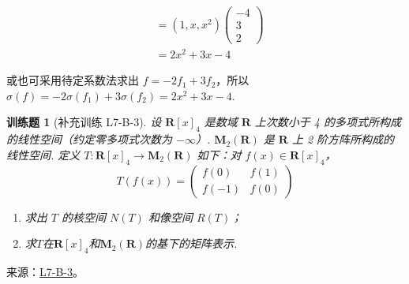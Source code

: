 \documentclass[UTF8,12pt,a4paper,fontset=fandol]{ctexart}
\newtheorem{exercise}{训练题}[section]
\begin{document}
\begin{solve}
\begin{enumerate}
\begin{align*}
                                    & = (1, x, x^2)
                          \begin{pmatrix} -4 \\ 3 \\ 2 \end{pmatrix}                          \\
                                    & = 2x^2 + 3x - 4
                      \end{align*}

                      或也可采用待定系数法求出 $ f = -2 f_1 + 3 f_2 $，所以 $ \sigma(f) = -2 \sigma(f_1) + 3 \sigma(f_2) = 2x^2 + 3x - 4 $.
            \end{enumerate}
\end{solve}

\begin{exercise}[补充训练 L7-B-3]\label{prob:L7-B-3}
设 $\mathbf{R}[x]_4$ 是数域 $\mathbf{R}$ 上次数小于 4 的多项式所构成的线性空间（约定零多项式次数为 $-\infty$）. $\mathbf{M}_2(\mathbf{R})$ 是 $\mathbf{R}$ 上 2 阶方阵所构成的线性空间. 定义 $T \colon \mathbf{R}[x]_4 \to \mathbf{M}_2(\mathbf{R})$ 如下：对 $f(x) \in \mathbf{R}[x]_4$，
        \[T(f(x))=\begin{pmatrix}f(0) & f(1) \\ f(-1) & f(0)\end{pmatrix}\]
        \begin{enumerate}
            \item 求出 $T$ 的核空间 $N(T)$ 和像空间 $R(T)$；

            \item 求$T$在$\mathbf{R}[x]_4$和$\mathbf{M}_2(\mathbf{R})$的基下的矩阵表示.
        \end{enumerate}
\end{exercise}
\noindent 来源：\href{https://github.com/yhwu-is/Linear-Algebra-Left-Undone/blob/new/%E8%AE%B2%E4%B9%89/%E4%B8%93%E9%A2%98/7%20%E7%BA%BF%E6%80%A7%E6%98%A0%E5%B0%84%E7%9F%A9%E9%98%B5%E8%A1%A8%E7%A4%BA%E4%B8%8E%E7%9F%A9%E9%98%B5%E8%BF%90%E7%AE%97%E5%9F%BA%E7%A1%80.tex}{L7-B-3}。
\end{document}
